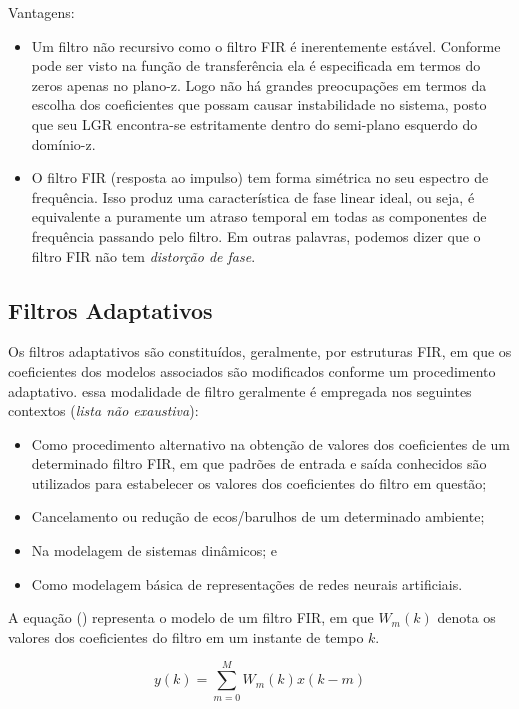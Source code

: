 		Vantagens:
		\begin{itemize}
			\item Um filtro não recursivo como o filtro FIR é inerentemente estável. Conforme pode ser visto na função de transferência ela é especificada em termos do zeros apenas no plano-z. Logo não há grandes preocupações em termos da escolha dos coeficientes que possam causar instabilidade no sistema, posto que seu LGR encontra-se estritamente dentro do semi-plano esquerdo do domínio-z.
			\item O filtro FIR (resposta ao impulso) tem forma simétrica no seu espectro de frequência. Isso produz uma característica de fase linear ideal, ou seja, é equivalente a puramente um atraso temporal em todas as componentes de frequência passando pelo filtro. Em outras palavras, podemos dizer que o filtro FIR não tem \textit{distorção de fase}.
		\end{itemize}
	\cite{Lynn1998}
	
	\subsection{Filtros Adaptativos}
	
		Os filtros adaptativos são constituídos, geralmente, por estruturas FIR, em que os coeficientes dos modelos associados são modificados conforme um procedimento adaptativo. essa modalidade de filtro geralmente é empregada nos seguintes contextos (\textit{lista não exaustiva}):
		
		\begin{itemize}
			\item Como procedimento alternativo na obtenção de valores dos coeficientes de um determinado filtro FIR, em que padrões de entrada e saída conhecidos são utilizados para estabelecer os valores dos coeficientes do filtro em questão;
			\item Cancelamento ou redução de ecos/barulhos de um determinado ambiente;
			\item Na modelagem de sistemas dinâmicos; e
			\item Como modelagem básica de representações de redes neurais artificiais.
		\end{itemize}
	
		A equação () representa o modelo de um filtro FIR, em que $W_m(k)$ denota os valores dos coeficientes do filtro em um instante de tempo $k$. 
		
		\begin{equation}
			\label{eq1-filtroadap}
			y(k) = \sum_{m=0}^{M} W_m(k)x(k-m)
		\end{equation}
		
